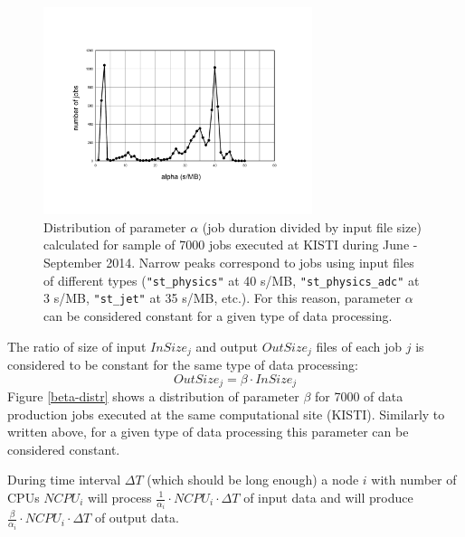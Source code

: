 \documentclass[english]{ddny}
\begin{document}
\begin{figure}[h]
	\begin{center}
		\includegraphics [trim= 20mm 30mm 10mm 30mm , clip, width=0.7\textwidth]{pic/alpha.pdf}
	\end{center}
	\caption{Distribution of parameter $\alpha$ (job duration divided by input file size) calculated for sample of 7000 jobs executed at KISTI during June - September 2014. Narrow peaks correspond to jobs using input files of different types (\texttt{"st\_physics"} at 40 s/MB, \texttt{"st\_physics\_adc"} at 3 s/MB, \texttt{"st\_jet"} at 35 s/MB, etc.). For this reason, parameter $\alpha$ can be considered constant for a given type of data processing.}
	\label{alpha-distr}
\end{figure} 

The ratio of size of input $InSize_{j}$ and output $OutSize_{j}$ files of each job $j$ is considered to be constant for the same type of data processing:
\begin{equation}
\label{beta}
OutSize_{j} = \beta \cdot InSize_{j} 
\end{equation}
Figure \ref{beta-distr} shows a distribution of parameter $\beta$ for 7000 of data production jobs executed at the same computational site (KISTI). Similarly to written above, for a given type of data processing this parameter can be considered constant. 

During time interval $\Delta T$ (which should be long enough) a node $i$ with number of CPUs $NCPU_{i}$ will process $\frac{1}{\alpha_{i}} \cdot NCPU_{i} \cdot \Delta T$ of input data and will produce $\frac{\beta}{\alpha_{i}} \cdot NCPU_{i} \cdot \Delta T$ of output data.
\end{document}
